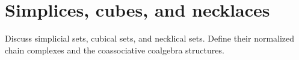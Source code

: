 
\section{Simplices, cubes, and necklaces}

Discuss simplicial sets, cubical sets, and necklical sets. Define their normalized chain complexes and the coassociative coalgebra structures.




